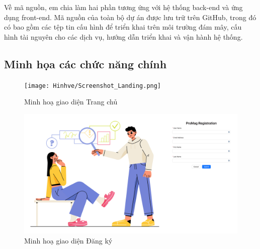 \documentclass[../DoAn.tex]{subfiles}
\begin{document}
Về mã nguồn, em chia làm hai phần tương ứng với hệ thống back-end và ứng dụng front-end.
Mã nguồn của toàn bộ dự án được lưu trữ trên GitHub, trong đó có bao gồm các tệp tin cấu hình để triển khai trên môi trường đám mây, cấu hình
tài nguyên cho các dịch vụ, hướng dẫn triển khai và vận hành hệ thống.

\newpage


\subsection{Minh họa các chức năng chính}
\label{subsection:4.3.3}

\begin{figure}[H]
    \centering
    \texttt{[image: Hinhve/Screenshot\_Landing.png]}
    \caption{Minh hoạ giao diện Trang chủ}
    \label{fig:Screenshot_Landing}
\end{figure}


\begin{figure}[H]
    \centering
    \includegraphics[width=1.0\linewidth]{Hinhve/Screenshot_Register.png}
    \caption{Minh hoạ giao diện Đăng ký}
    \label{fig:Screenshot_Register}
\end{figure}

\newpage
\end{document}
